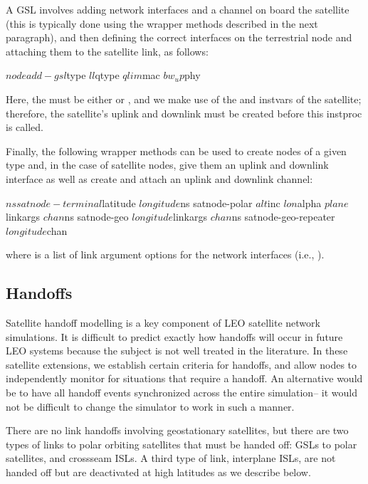 A GSL involves adding network interfaces and a channel on board the
satellite (this is typically done using the wrapper methods described
in the next paragraph), and then defining the correct interfaces on
the terrestrial node and attaching them to the satellite link, as 
follows:
\begin{program}
$node add-gsl $type $ll $qtype $qlim $mac $bw_up $phy 
\end{program}
Here, the  must be either  or , 
and we make use
of the  and  instvars of the satellite;
therefore, the satellite's uplink and downlink must be created before
this instproc is called.

Finally, the following wrapper methods can be used to create nodes of a 
given type and, in the case of satellite nodes, give them an uplink and
downlink interface as well as create and attach an uplink and downlink
channel: 
\begin{program}
$ns satnode-terminal $latitude $longitude
$ns satnode-polar $alt $inc $lon $alpha $plane $linkargs $chan
$ns satnode-geo $longitude $linkargs $chan
$ns satnode-geo-repeater $longitude $chan
\end{program}
where  is a list of link argument options for the 
network interfaces (i.e., ). 



\subsection{Handoffs }
\label{sec:satellite/usage/handoffs}

Satellite handoff modelling is a key component of LEO satellite network 
simulations.  It is difficult to predict exactly how handoffs will occur
in future LEO systems because the subject is not well treated in the
literature.  In these satellite extensions, we establish certain criteria for 
handoffs, and allow nodes to independently monitor for situations that 
require a handoff.  An alternative would be to have all handoff events
synchronized across the entire simulation-- it would not be difficult to 
change the simulator to work in such a manner.

There are no link handoffs involving geostationary satellites, but there 
are two types of links to polar orbiting satellites
that must be handed off:  GSLs to polar satellites, and crossseam ISLs.  
A third type of link, interplane ISLs, are not handed off but are deactivated
at high latitudes as we describe below.

